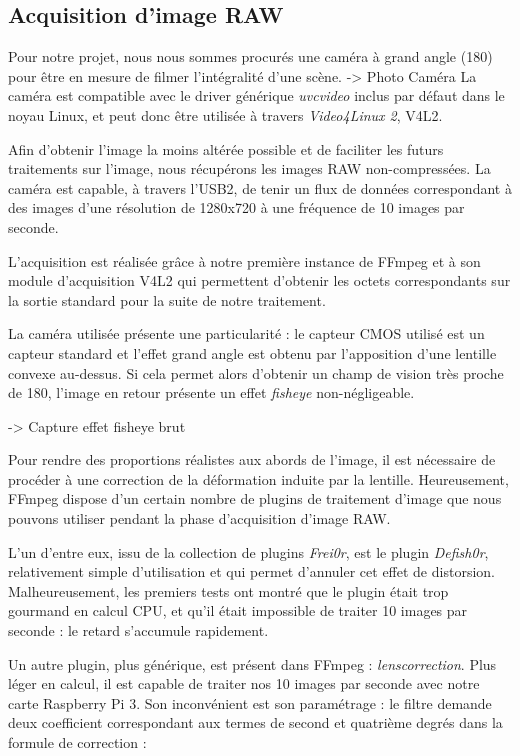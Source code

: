 \documentclass[11pt,a4paper]{article}
\begin{document}
\subsection{Acquisition d'image RAW}
Pour notre projet, nous nous sommes procurés une caméra à grand angle (180\degree) pour être en mesure de filmer l'intégralité d'une scène.
\bigbreak
-> Photo Caméra
\bigbreak
La caméra est compatible avec le driver générique \textit{uvcvideo} inclus par défaut dans le noyau Linux, et peut donc être utilisée à travers \textit{Video4Linux 2}, V4L2.

\bigbreak
Afin d'obtenir l'image la moins altérée possible et de faciliter les futurs traitements sur l'image, nous récupérons les images RAW non-compressées.
La caméra est capable, à travers l'USB2, de tenir un flux de données correspondant à des images d'une résolution de 1280x720 à une fréquence de 10 images par seconde.

\bigbreak
L'acquisition est réalisée grâce à notre première instance de FFmpeg et à son module d'acquisition V4L2 qui permettent d'obtenir les octets correspondants sur la sortie standard pour la suite de notre traitement.

\bigbreak
La caméra utilisée présente une particularité : le capteur CMOS utilisé est un capteur standard et l'effet grand angle est obtenu par l'apposition d'une lentille convexe au-dessus.
Si cela permet alors d'obtenir un champ de vision très proche de 180\degree, l'image en retour présente un effet \textit{fisheye} non-négligeable.

\bigbreak
-> Capture effet fisheye brut
\bigbreak

Pour rendre des proportions réalistes aux abords de l'image, il est nécessaire de procéder à une correction de la déformation induite par la lentille.
Heureusement, FFmpeg dispose d'un certain nombre de plugins de traitement d'image que nous pouvons utiliser pendant la phase d'acquisition d'image RAW.

\bigbreak
L'un d'entre eux, issu de la collection de plugins \textit{Frei0r}, est le plugin \textit{Defish0r}, relativement simple d'utilisation et qui permet d'annuler cet effet de distorsion.
Malheureusement, les premiers tests ont montré que le plugin était trop gourmand en calcul CPU, et qu'il était impossible de traiter 10 images par seconde : le retard s'accumule rapidement.

\bigbreak
Un autre plugin, plus générique, est présent dans FFmpeg : \textit{lenscorrection}.
Plus léger en calcul, il est capable de traiter nos 10 images par seconde avec notre carte Raspberry Pi 3.
Son inconvénient est son paramétrage : le filtre demande deux coefficient correspondant aux termes de second et quatrième degrés dans la formule de correction :
\end{document}
